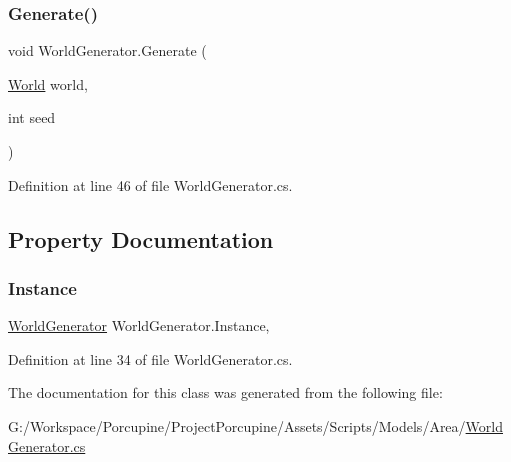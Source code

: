 \subsubsection{\texorpdfstring{Generate()}{Generate()}}
{\footnotesize\ttfamily void World\+Generator.\+Generate (\begin{DoxyParamCaption}\item[{\hyperlink{class_world}{World}}]{world,  }\item[{int}]{seed }\end{DoxyParamCaption})}



Definition at line 46 of file World\+Generator.\+cs.



\subsection{Property Documentation}
\mbox{\label{class_world_generator_a9884276e6346c35ee206f1ce769e074f}} 
\subsubsection{\texorpdfstring{Instance}{Instance}}
{\footnotesize\ttfamily \hyperlink{class_world_generator}{World\+Generator} World\+Generator.\+Instance\hspace{0.3cm}{\ttfamily [static]}, {\ttfamily [get]}}



Definition at line 34 of file World\+Generator.\+cs.



The documentation for this class was generated from the following file\+:\begin{DoxyCompactItemize}
\item 
G\+:/\+Workspace/\+Porcupine/\+Project\+Porcupine/\+Assets/\+Scripts/\+Models/\+Area/\hyperlink{_world_generator_8cs}{World\+Generator.\+cs}\end{DoxyCompactItemize}
